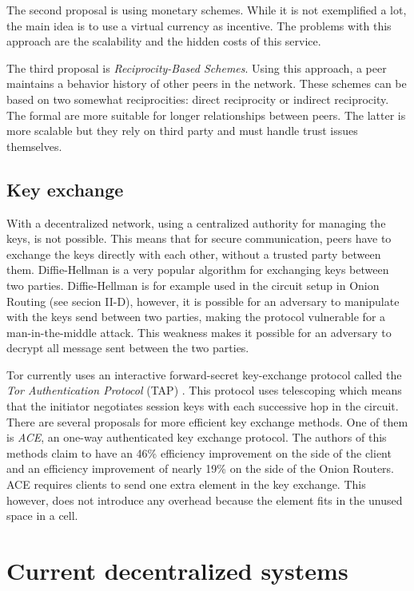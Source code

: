 \documentclass{article}
\begin{document}
		The second proposal is using monetary schemes. While it is not exemplified a lot, the main idea is to use a virtual currency as incentive. The problems with this approach are the scalability and the hidden costs of this service.
		
		The third proposal is \emph{Reciprocity-Based Schemes}. Using this approach, a peer maintains a behavior history of other peers in the network. These schemes can be based on two somewhat reciprocities: direct reciprocity or indirect reciprocity. The formal are more suitable for longer relationships between peers. The latter is more scalable but they rely on third party and must handle trust issues themselves.

	\subsection{Key exchange}
		With a decentralized network, using a centralized authority for managing the keys, is not possible. This means that for secure communication, peers have to exchange the keys directly with each other, without a trusted party between them. Diffie-Hellman is a very popular algorithm for exchanging keys between two parties. Diffie-Hellman is for example used in the circuit setup in Onion Routing (see secion II-D), however, it is possible for an adversary to manipulate with the keys send between two parties, making the protocol vulnerable for a man-in-the-middle attack. This weakness makes it possible for an adversary to decrypt all message sent between the two parties.

		Tor currently uses an interactive forward-secret key-exchange protocol called the \emph{Tor Authentication Protocol} (TAP) \cite{backes2012ace}. This protocol uses telescoping which means that the initiator negotiates session keys with each successive hop in the circuit. There are several proposals for more efficient key exchange methods. One of them is \emph{ACE}, an one-way authenticated key exchange protocol. The authors of this methods claim to have an 46\% efficiency improvement on the side of the client and an efficiency improvement of nearly 19\% on the side of the Onion Routers. ACE requires clients to send one extra element in the key exchange. This however, does not introduce any overhead because the element fits in the unused space in a cell.

\section{Current decentralized systems}
	\label{sec:decentralized}
	
\end{document}
